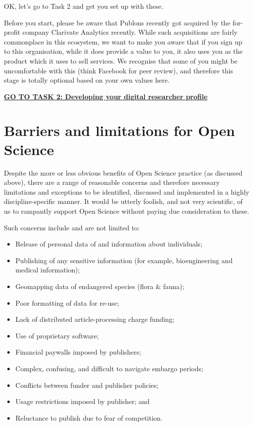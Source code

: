 \documentclass[]{book}
\begin{document}
OK, let's go to Task 2 and get you set up with these.

Before you start, please be aware that Publons recently got acquired by the for-profit company Clarivate Analytics recently. While such acquisitions are fairly commonplace in this ecosystem, we want to make you aware that if you sign up to this organisation, while it does provide a value to you, it also uses you as the product which it uses to sell services. We recognise that some of you might be uncomfortable with this (think Facebook for peer review), and therefore this stage is totally optional based on your own values here.

\href{Task_2.md}{\textbf{GO TO TASK 2: Developing your digital researcher profile}}

\hypertarget{barriers-and-limitations-for-open-science}{%
\section{Barriers and limitations for Open Science }\label{barriers-and-limitations-for-open-science}}

Despite the more or less obvious benefits of Open Science practice (as discussed above), there are a range of reasonable concerns and therefore necessary limitations and exceptions to be identified, discussed and implemented in a highly discipline-specific manner. It would be utterly foolish, and not very scientific, of us to rampantly support Open Science without paying due consideration to these.

Such concerns include and are not limited to:

\begin{itemize}
\item
  Release of personal data of and information about individuals;
\item
  Publishing of any sensitive information (for example, bioengineering and medical information);
\item
  Geomapping data of endangered species (flora \& fauna);
\item
  Poor formatting of data for re-use;
\item
  Lack of distributed article-processing charge funding;
\item
  Use of proprietary software;
\item
  Financial paywalls imposed by publishers;
\item
  Complex, confusing, and difficult to navigate embargo periods;
\item
  Conflicts between funder and publisher policies;
\item
  Usage restrictions imposed by publisher; and
\item
  Reluctance to publish due to fear of competition.
\end{itemize}
\end{document}
